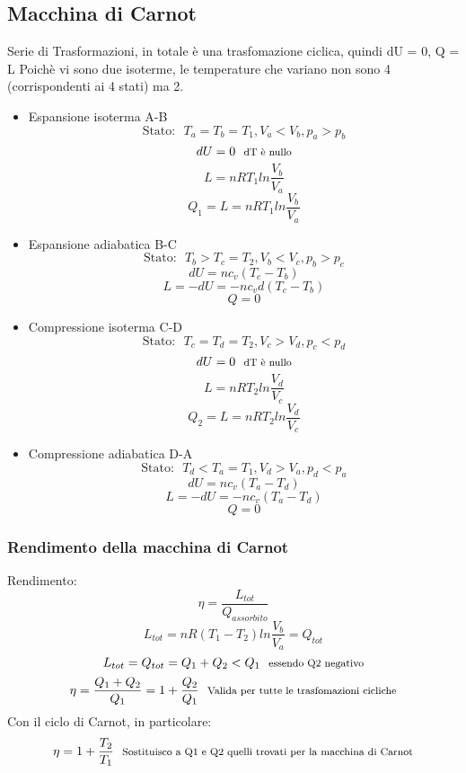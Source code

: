 \documentclass[12pt]{article}
\begin{document}
    \subsection{Macchina di Carnot}
        Serie di Trasformazioni, in totale è una trasfomazione ciclica, quindi dU = 0, Q = L
        Poichè vi sono due isoterme, le temperature che variano non sono 4 (corrispondenti ai 4 stati) ma 2.
        \begin{itemize}
            \item Espansione isoterma A-B
            \[\text{Stato:}\:\:\:T_a = T_b = T_1, V_a < V_b, p_a > p_b\]
            \[dU = 0 \:\:\: \text{\footnotesize{dT è nullo}}\]
            \[L = n R T_1 ln{\frac{V_b}{V_a}}\]
            \[Q_1 = L = n R T_1 ln{\frac{V_b}{V_a}}\]
            \item Espansione adiabatica B-C
            \[\text{Stato:}\:\:\:T_b > T_c = T_2, V_b < V_c, p_b > p_c\]
            \[dU = n c_v (T_c - T_b)\]
            \[L = -dU = -n c_v d(T_c - T_b)\]
            \[Q = 0\]
            \item Compressione isoterma C-D
            \[\text{Stato:}\:\:\:T_c = T_d = T_2, V_c > V_d, p_c < p_d\]
            \[dU = 0 \:\:\: \text{\footnotesize{dT è nullo}}\]
            \[L = n R T_2 ln{\frac{V_d}{V_c}}\]
            \[Q_2 = L = n R T_2 ln{\frac{V_d}{V_c}}\]
            \item Compressione adiabatica D-A
            \[\text{Stato:}\:\:\:T_d < T_a = T_1, V_d > V_a, p_d < p_a\]
            \[dU = n c_v (T_a - T_d)\]
            \[L = -dU = -n c_v (T_a - T_d)\]
            \[Q = 0\]
        \end{itemize}
        \subsubsection{Rendimento della macchina di Carnot}
        Rendimento:
        \[\eta = \frac{L_{tot}}{Q_{assorbito}} \]
        \[L_{tot} = nR(T_1-T_2)ln{\frac{V_b}{V_a}} = Q_{tot}\]
        \[L_{tot} = Q_{tot} =  Q_1 + Q_2 < Q_1 \:\:\:\text{\footnotesize{essendo Q2 negativo}}\]
        \[\eta = \frac{Q_1 + Q_2}{Q_1} = 1 + \frac{Q_2}{Q_1} \:\:\:\text{\footnotesize{Valida per tutte le trasfomazioni cicliche}} \]
        Con il ciclo di Carnot, in particolare:
        \[\eta = 1 + \frac{T_2}{T_1} \:\:\:\text{\footnotesize{Sostituisco a Q1 e Q2 quelli trovati per la macchina di Carnot}} \]
\end{document}

